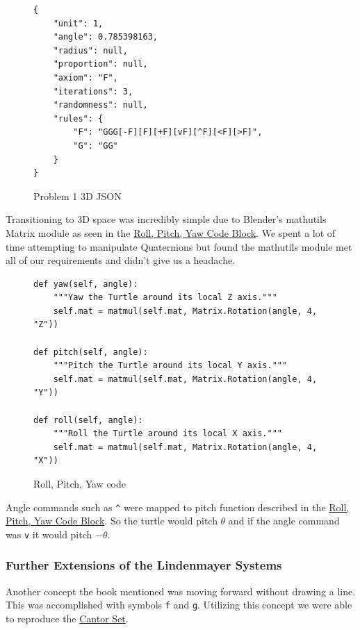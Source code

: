 \begin{figure}
\begin{verbatim}
{
    "unit": 1,
    "angle": 0.785398163,
    "radius": null,
    "proportion": null,
    "axiom": "F",
    "iterations": 3,
    "randomness": null,
    "rules": {
        "F": "GGG[-F][F][+F][vF][^F][<F][>F]",
        "G": "GG"
    }
}
\end{verbatim}
\caption*{Problem 1 3D JSON}
\label{code:prob1_3D_json}
\end{figure}

Transitioning to 3D space was incredibly simple due to Blender's mathutils 
Matrix module as seen in the 
\hyperref[code:roll_pitch_yaw]{Roll, Pitch, Yaw Code Block}. We spent a lot of 
time attempting to manipulate Quaternions but found the mathutils module met 
all of our requirements and didn't give us a headache.

\begin{figure}
\begin{verbatim}
def yaw(self, angle):
    """Yaw the Turtle around its local Z axis."""
    self.mat = matmul(self.mat, Matrix.Rotation(angle, 4, "Z"))

def pitch(self, angle):
    """Pitch the Turtle around its local Y axis."""
    self.mat = matmul(self.mat, Matrix.Rotation(angle, 4, "Y"))

def roll(self, angle):
    """Roll the Turtle around its local X axis."""
    self.mat = matmul(self.mat, Matrix.Rotation(angle, 4, "X"))
\end{verbatim}
\caption*{Roll, Pitch, Yaw code}
\label{code:roll_pitch_yaw}
\end{figure}

Angle commands such as \texttt{\^} were mapped to pitch function described in 
the \hyperref[code:roll_pitch_yaw]{Roll, Pitch, Yaw Code Block}. So the turtle 
would pitch $\theta$ and if the angle command was \texttt{v} it would pitch 
$-\theta$.





\subsubsection{Further Extensions of the Lindenmayer Systems}
Another concept the book mentioned was moving forward without drawing a line. 
This was accomplished with symbols \texttt{f} and \texttt{g}. Utilizing this 
concept we were able to reproduce the 
\href{https://sketchfab.com/3d-models/cantor-f645d6ae69a748a283a737f44660c5f6}{Cantor Set}.

